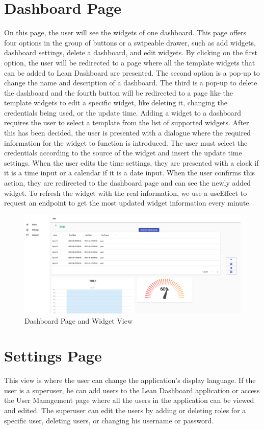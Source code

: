 \documentclass[a4paper,twoside,10pt]{report}
\begin{document}
\newpage
\section{Dashboard Page}
On this page, the user will see the widgets of one dashboard. This page offers four options in the group of buttons or a swipeable drawer, such as add widgets, dashboard settings, delete a dashboard, and edit widgets.
By clicking on the first option, the user will be redirected to a page where all the template widgets that can be added to Lean Dashboard are presented.
The second option is a pop-up to change the name and description of a dashboard.
The third is a pop-up to delete the dashboard and the fourth button will be redirected to a page like the template widgets to edit a specific widget, like deleting it, changing the credentials being used, or the update time.
\newline
Adding a widget to a dashboard requires the user to select a template from the list of supported widgets. After this has been decided, the user is presented with a dialogue where the required information for the widget to function is introduced. The user must select the credentials according to the source of the widget and insert the update time settings. When the user edits the time settings, they are presented with a clock if it is a time input or a calendar if it is a date input. When the user confirms this action, they are redirected to the dashboard page and can see the newly added widget. To refresh the widget with the real information, we use a useEffect to request an endpoint to get the most updated widget information every minute.

\begin{figure}[h!]
\center
  \includegraphics[width=\textwidth]{dashboardPage.png}
\caption{Dashboard Page and Widget View}
\end{figure}

\section{Settings Page}
This view is where the user can change the application's display language. If the user is a superuser, he can add users to the Lean Dashboard application or access the User Management page where all the users in the application can be viewed and edited. The superuser can edit the users by adding or deleting roles for a specific user, deleting users, or changing his username or password. 
\end{document}
